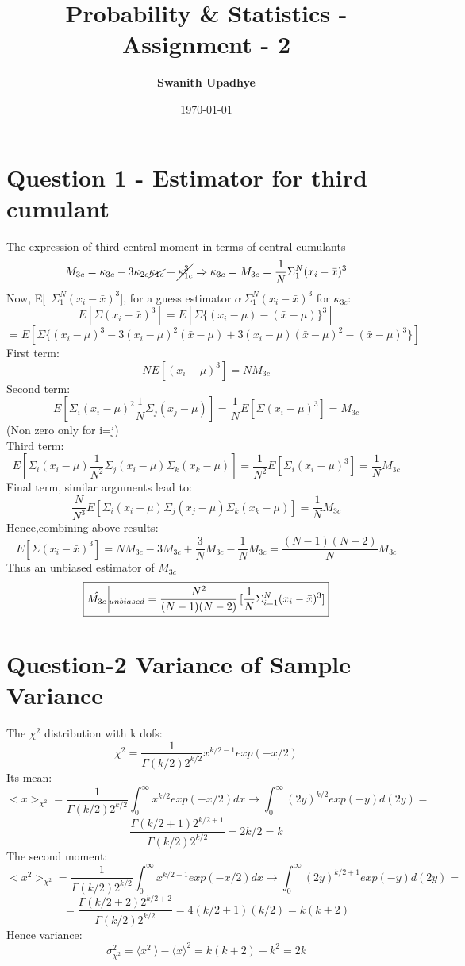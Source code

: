 \documentclass[11pt]{article}
\title{Probability \& Statistics - Assignment - 2}
\author{\textbf{\Large Swanith Upadhye}}
\date{\today}
\begin{document}
	
	\maketitle
	\noindent\hrulefill
	\Large
	
	\section{\color{teal}Question 1 - Estimator for third cumulant}
	
	The expression of third central moment in terms of central cumulants
	\[
		M_{3c} = \kappa_{3c} - 3\kappa_{2c}\cancel{\kappa_{1c}} + \cancel{\kappa_{1c}^3} \Rightarrow \kappa_{3c} = M_{3c}= \frac{1}{N}\Sigma_1^N (x_i - \bar{x})^3
	\]
	Now, E[\ \(\Sigma_1^N(x_i-\bar{x})^3\)], for a guess estimator $\alpha \, \Sigma_1^N(x_i-\bar{x})^3$ for $\kappa_{3c}$:
	\[
		E[\Sigma(x_i-\bar{x})^3] = E[\Sigma\{(x_i-\mu)-(\bar{x}-\mu)\}^3] 
	\]
	\[
		= E[\Sigma\{(x_i-\mu)^3 -3(x_i-\mu)^2(\bar{x}-\mu) + 3(x_i-\mu)(\bar{x}-\mu)^2 - (\bar{x}-\mu)^3\}]
	\]
	First term:
	\[
		NE[(x_i-\mu)^3] = N M_{3c}
	\]
	Second term:
	\[
		E[\Sigma_i(x_i-\mu)^2 \frac{1}{N}\Sigma_j(x_j-\mu)] = \frac{1}{N}E[\Sigma(x_i - \mu)^3] =M_{3c}
	\]
	(Non zero only for i=j)\\
	Third term:
	\[
		E[\Sigma_i(x_i-\mu)\frac{1}{N^2}\Sigma_j(x_i-\mu)\Sigma_k(x_k-\mu)] = \frac{1}{N^2}E[\Sigma_i(x_i-\mu)^3] = \frac{1}{N} M_{3c}
	\]
	Final term, similar arguments lead to:
	\[
		\frac{N}{N^3}E[\Sigma_i(x_i-\mu)\Sigma_j(x_j-\mu)\Sigma_k(x_k-\mu)] = \frac{1}{N}M_{3c}
	\]
	Hence,combining above results:
	\[
		E[\Sigma(x_i-\bar{x})^3] = NM_{3c} - 3M_{3c}+\frac{3}{N}M_{3c} - \frac{1}{N}M_{3c} =\frac{(N-1)(N-2)}{N}M_{3c}
	\]
	Thus an unbiased estimator of $M_{3c}$
	\[
		\boxed{\hat{M_{3c}}\, \vline_{unbiased} = \frac{N^2}{(N-1)(N-2)} \, [\frac{1}{N}\Sigma_{i=1}^N	(x_i - \bar{x})^3]}
	\]
	
	\section{\color{teal}Question-2 Variance of Sample Variance} 
	 
	 The $\chi^2$ distribution with k dofs:
	 \[
	 	\chi^2 = \frac{1}{\Gamma(k/2)2^{k/2}}x^{k/2-1}exp(-x/2)
	 \]
	Its mean:
	\[
		<x>_{\chi^2} = \frac{1}{\Gamma(k/2)2^{k/2}}\int_0^\infty x^{k/2} exp(-x/2)dx \rightarrow \int_0^\infty (2y)^{k/2}exp(-y)d(2y) =
	\]
	\[	
		 \frac{\Gamma(k/2 + 1)2^{k/2+1}}{\Gamma(k/2)2^{k/2}} = 2k/2 = k
	\]
	The second moment:
	\[
		<x^2>_{\chi^2} = \frac{1}{\Gamma(k/2)2^{k/2}}\int_0^\infty x^{k/2+1} exp(-x/2)dx \rightarrow \int_0^\infty (2y)^{k/2+1}exp(-y)d(2y) =
	\]
	\[
		= \frac{\Gamma(k/2 + 2)2^{k/2+2}}{\Gamma(k/2)2^{k/2}} = 4(k/2+1)(k/2) = k(k+2)
	\]
	Hence variance:
	\[
		\sigma^2_{\chi^2} = \langle x^2\ \rangle - \langle x \rangle^2 = k(k+2) - k^2 =2k
	\]
\end{document}
